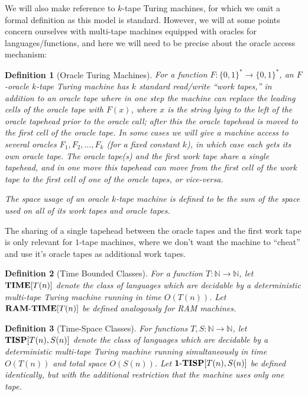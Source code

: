 \documentclass[11pt]{article}
\newtheorem{definition}{Definition}
\newcommand{\dash}{\text{-}}
\newcommand{\B}{\{0,1\}}
\def\cl{\bf}
\begin{document}
We will also make reference to $k$-tape Turing machines, for which we omit a formal definition as this model is standard. However, we will at some points concern ourselves with multi-tape machines equipped with oracles for languages/functions, and here we will need to be precise about the oracle access mechanism:
\begin{definition}[Oracle Turing Machines]
For a function $F\colon \B^* \rightarrow \B^*$, an $F$-oracle $k$-tape Turing machine has $k$ standard read/write ``work tapes,'' in addition to an oracle tape where in one step the machine can replace the leading cells of the oracle tape with $F(x)$, where $x$ is the string lying to the left of the oracle tapehead prior to the oracle call; after this the oracle tapehead is moved to the first cell of the oracle tape. In some cases we will give a machine access to several oracles $F_1,F_2,\ldots,F_k$ (for a fixed constant $k$), in which case each gets its own oracle tape. The oracle tape(s) and the first work tape share a single tapehead, and in one move this tapehead can move from the first cell of the work tape to the first cell of one of the oracle tapes, or vice-versa. 

The space usage of an oracle $k$-tape machine is defined to be the sum of the space used on all of its work tapes and oracle tapes.
\end{definition}
The sharing of a single tapehead between the oracle tapes and the first work tape is only relevant for $1$-tape machines, where we don't want the machine to ``cheat'' and use it's oracle tapes as additional work tapes.

\begin{definition}[Time Bounded Classes]
\sloppy For a function $T\colon\mathbb{N} \rightarrow \mathbb{N}$, let ${\cl TIME}[T(n)]$ denote the class of languages which are decidable by a deterministic multi-tape Turing machine running in time $O(T(n))$. 
Let ${\cl RAM\dash TIME}[T(n)]$ be defined analogously for RAM machines.
\end{definition}
\begin{definition}[Time-Space Classes]
For functions $T,S\colon\mathbb{N} \rightarrow \mathbb{N}$, let ${\cl TISP}[T(n),S(n)]$ denote the class of languages which are decidable by a deterministic multi-tape Turing machine running simultaneously in time $O(T(n))$ and total space $O(S(n))$. Let ${\cl 1\dash TISP}[T(n),S(n)]$ be defined identically, but with the additional restriction that the machine uses only one tape.
\end{definition}
\end{document}
